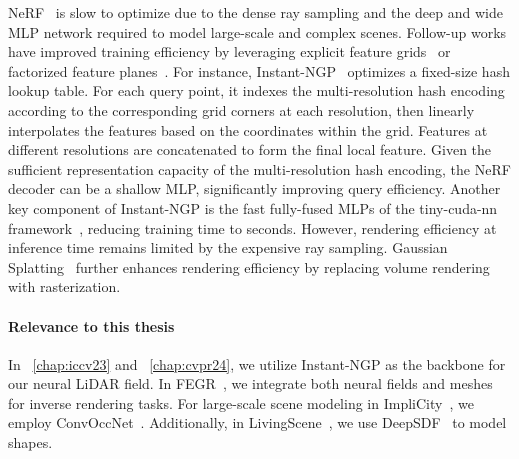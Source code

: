 NeRF~\cite{mildenhall2020nerf} is slow to optimize due to the dense ray sampling and the deep and wide MLP network required to model large-scale and complex scenes. Follow-up works have improved training efficiency by leveraging explicit feature grids~\cite{mueller2022instant,SunSC22,fridovich2022plenoxels,yu2021plenoxels} or factorized feature planes~\cite{chen2022tensorf,kplanes_2023}. For instance, Instant-NGP~\cite{mueller2022instant} optimizes a fixed-size hash lookup table. For each query point, it indexes the multi-resolution hash encoding according to the corresponding grid corners at each resolution, then linearly interpolates the features based on the coordinates within the grid. Features at different resolutions are concatenated to form the final local feature. Given the sufficient representation capacity of the multi-resolution hash encoding, the NeRF decoder can be a shallow MLP, significantly improving query efficiency. Another key component of Instant-NGP is the fast fully-fused MLPs of the tiny-cuda-nn framework~\cite{tiny-cuda-nn}, reducing training time to seconds. However, rendering efficiency at inference time remains limited by the expensive ray sampling. Gaussian Splatting~\cite{kerbl20233d} further enhances rendering efficiency by replacing volume rendering with rasterization.

\paragraph{Relevance to this thesis} In ~\cref{chap:iccv23} and ~\cref{chap:cvpr24}, we utilize Instant-NGP as the backbone for our neural LiDAR field. In FEGR~\cite{wang2023neural}, we integrate both neural fields and meshes for inverse rendering tasks. For large-scale scene modeling in ImpliCity~\cite{stucker2022implicity}, we employ ConvOccNet~\cite{peng2020convolutional}. Additionally, in LivingScene~\cite{zhu2023living}, we use DeepSDF~\cite{park2019deepsdf} to model shapes.